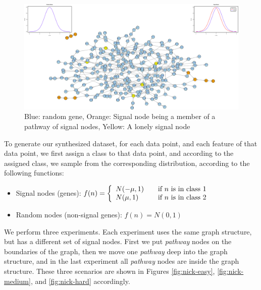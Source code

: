 \begin{figure}[!ht]
  \centering
  \includegraphics[width=\textwidth]{figs/nick/synthesized-1slide}
  \caption{{\color{blue}Blue}: random gene, {\color{orange}Orange}: Signal node being a member of a pathway of signal nodes, {\color{yellow}Yellow}: A lonely signal node}
  \label{fig:syn-1slide}
\end{figure}

To generate our synthesized dataset, for each data point, and each feature of that data point, we first assign a class to that data point, and according to the assigned class, we sample from the corresponding distribution, according to the following functions:

\begin{itemize}
\item Signal nodes (genes):
  $ f(n) = \left\{ 
  \begin{array}{l l}
    N(-\mu, 1) & \quad \text{if $n$ is in class $1$}\\
    N(\mu, 1) & \quad \text{if $n$ is in class $2$}
  \end{array} \right.$
\item Random nodes (non-signal genes): $f(n) = N(0, 1)$
\end{itemize}

We perform three experiments. Each experiment uses the same graph structure, but has a different set of signal nodes. First we put \emph{pathway} nodes on the boundaries of the graph, then we move one \emph{pathway} deep into the graph structure, and in the last experiment all \emph{pathway} nodes are inside the graph structure. These three scenarios are shown in Figures \ref{fig:nick-easy}, \ref{fig:nick-medium}, and \ref{fig:nick-hard} accordingly.

